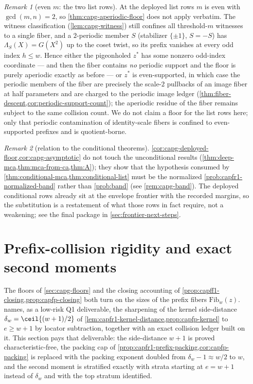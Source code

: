 \documentclass[11pt]{article}
\theoremstyle{definition}
\theoremstyle{remark}
\newtheorem{remark}[remark]{Remark}
\begin{document}
\begin{remark}[even $m$: the two list rows]\label{rem:capg-evenm}
At the deployed list rows $m$ is even with $\gcd(m,n)=2$, so
\cref{thm:capg-aperiodic-floor} does not apply verbatim.  The witness
classification (\cref{lem:capg-witness}) still confines all threshold-$m$
witnesses to a single fiber, and a $2$-periodic member $S$ (stabilizer
$\{\pm1\}$, $S=-S$) has $\Lambda_S(X)=G(X^{2})$ up to the coset twist, so
its prefix vanishes at every odd index $h\leq w$.  Hence either the
pigeonholed $z^{*}$ has some nonzero odd-index coordinate --- and then the
fiber contains \emph{no} periodic support and the floor is purely
aperiodic exactly as before --- or $z^{*}$ is even-supported, in which case
the periodic members of the fiber are precisely the scale-$2$ pullbacks of
an image fiber at half parameters and are charged to the periodic image
ledger (\cref{thm:fiber-descent,cor:periodic-support-count}); the aperiodic
residue of the fiber remains subject to the same collision count.  We do not
claim a floor for the list rows here; only that periodic contamination of
identity-scale fibers is confined to even-supported prefixes and is
quotient-borne.
\end{remark}

\begin{remark}[relation to the conditional theorems]
\cref{cor:capg-deployed-floor,cor:capg-asymptotic} do not touch the
unconditional results (\cref{thm:deep-mca,thm:mca-from-ca,thm:A}); they
show that the hypothesis consumed by
\cref{thm:conditional-mca,thm:conditional-list} must be the
normalized \cref{prob:capfr1-normalized-band} rather than \cref{prob:band}
(see \cref{rem:capg-band}).
The deployed conditional rows already sit at the envelope frontier with the
recorded margins, so the substitution is a restatement of what those rows
in fact require, not a weakening; see the final package in
\cref{sec:frontier-next-steps}.
\end{remark}

\section{Prefix-collision rigidity and exact second moments}
\label{sec:capg-ledger}

The floors of \cref{sec:capg-floors} and the closing accounting of
\cref{prop:capff1-closing,prop:capfp-closing} both turn on the sizes of the
prefix fibers $\mathrm{Fib}_w(z)$.   names,
as a low-risk \textup{Q1} deliverable, the sharpening of the kernel
side-distance $\delta_w=\ceil{(w+1)/2}$ of
\cref{lem:capfr1-kernel-distance,prop:capfp-kernel} to $e\ge w+1$ by
locator subtraction, together with an exact collision ledger built on it.
This section pays that deliverable: the side-distance $w+1$ is proved
characteristic-free, the packing cap of
\cref{prop:capfr1-prefix-packing,cor:capfp-packing} is replaced with the
packing exponent doubled from $\delta_w-1\approx w/2$ to $w$, and the
second moment is stratified exactly with strata starting at $e=w+1$
instead of $\delta_w$ and with the top stratum identified.
\end{document}
